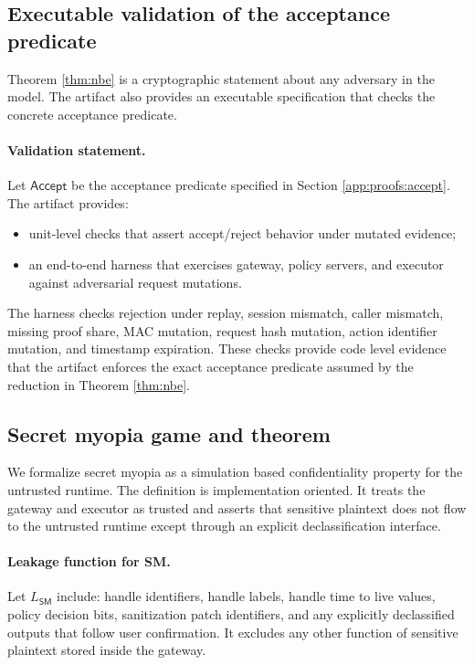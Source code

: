 \subsection{Executable validation of the acceptance predicate}
\label{app:proofs:executable}

Theorem \ref{thm:nbe} is a cryptographic statement about any adversary in the model.
The artifact also provides an executable specification that checks the concrete acceptance predicate.

\paragraph{Validation statement.}
Let $\mathsf{Accept}$ be the acceptance predicate specified in Section \ref{app:proofs:accept}.
The artifact provides:
\begin{itemize}
\item unit-level checks that assert accept/reject behavior under mutated evidence;
\item an end-to-end harness that exercises gateway, policy servers, and executor against adversarial request mutations.
\end{itemize}
The harness checks rejection under replay, session mismatch, caller mismatch, missing proof share,
MAC mutation, request hash mutation, action identifier mutation, and timestamp expiration.
These checks provide code level evidence that the artifact enforces the exact acceptance predicate
assumed by the reduction in Theorem \ref{thm:nbe}.

\subsection{Secret myopia game and theorem}
\label{app:proofs:sm}

We formalize secret myopia as a simulation based confidentiality property for the untrusted runtime.
The definition is implementation oriented.
It treats the gateway and executor as trusted and asserts that sensitive plaintext does not flow to
the untrusted runtime except through an explicit declassification interface.

\paragraph{Leakage function for SM.}
Let $L_{\mathsf{SM}}$ include:
handle identifiers,
handle labels,
handle time to live values,
policy decision bits,
sanitization patch identifiers,
and any explicitly declassified outputs that follow user confirmation.
It excludes any other function of sensitive plaintext stored inside the gateway.

